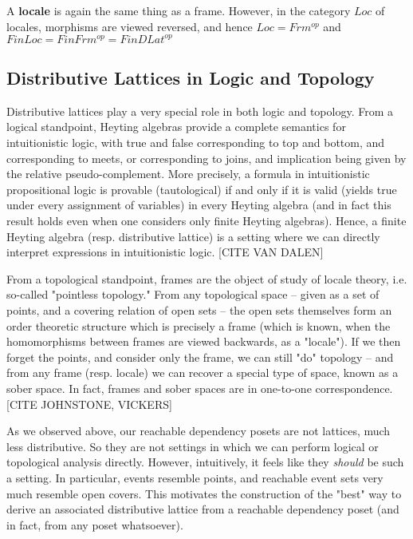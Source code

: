 \documentclass[hoptionsi,review,format=acmsmall]{acmart}
\theoremstyle{definition}
\begin{document}
A \textbf{locale} is again the same thing as a frame. However, in the category \(Loc\) of locales, morphisms are viewed reversed, and hence \(Loc = Frm^{op}\) and \(FinLoc = FinFrm^{op} = FinDLat^{op}\)

\subsection{Distributive Lattices in Logic and Topology}

Distributive lattices play a very special role in both logic and topology. From a logical standpoint, Heyting algebras provide a complete semantics for intuitionistic logic, with true and false corresponding to top and bottom, and corresponding to meets, or corresponding to joins, and implication being given by the relative pseudo-complement. More precisely, a formula in intuitionistic propositional logic is provable (tautological) if and only if it is valid (yields true under every assignment of variables) in every Heyting algebra (and in fact this result holds even when one considers only finite Heyting algebras). Hence, a finite Heyting algebra (resp. distributive lattice) is a setting where we can directly interpret expressions in intuitionistic logic. [CITE VAN DALEN]

From a topological standpoint, frames are the object of study of locale theory, i.e. so-called "pointless topology." From any topological space -- given as a set of points, and a covering relation of open sets -- the open sets themselves form an order theoretic structure which is precisely a frame (which is known, when the homomorphisms between frames are viewed backwards, as a "locale"). If we then forget the points, and consider only the frame, we can still "do" topology -- and from any frame (resp. locale) we can recover a special type of space, known as a sober space. In fact, frames and sober spaces are in one-to-one correspondence. [CITE JOHNSTONE, VICKERS]

As we observed above, our reachable dependency posets are not lattices, much less distributive. So they are not settings in which we can perform logical or topological analysis directly. However, intuitively, it feels like they \textit{should} be such a setting. In particular, events resemble points, and reachable event sets very much resemble open covers. This motivates the construction of the "best" way to derive an associated distributive lattice from a reachable dependency poset (and in fact, from any poset whatsoever).
\end{document}
